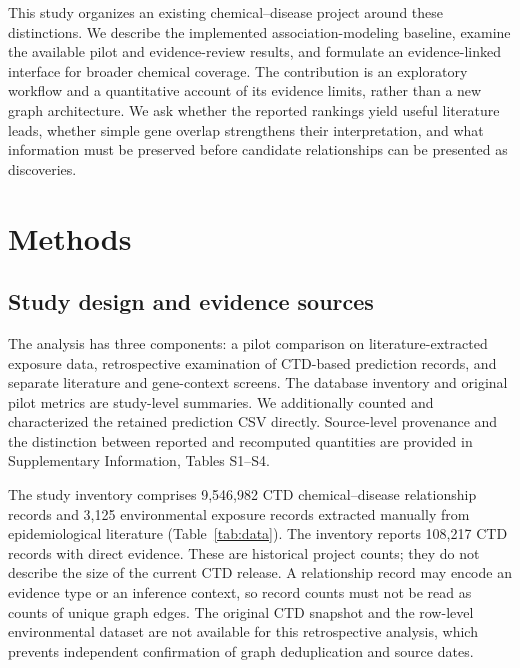 This study organizes an existing chemical--disease project around these distinctions. We describe the implemented association-modeling baseline, examine the available pilot and evidence-review results, and formulate an evidence-linked interface for broader chemical coverage. The contribution is an exploratory workflow and a quantitative account of its evidence limits, rather than a new graph architecture. We ask whether the reported rankings yield useful literature leads, whether simple gene overlap strengthens their interpretation, and what information must be preserved before candidate relationships can be presented as discoveries.

\section{Methods}
\subsection{Study design and evidence sources}
The analysis has three components: a pilot comparison on literature-extracted exposure data, retrospective examination of CTD-based prediction records, and separate literature and gene-context screens. The database inventory and original pilot metrics are study-level summaries. We additionally counted and characterized the retained prediction CSV directly. Source-level provenance and the distinction between reported and recomputed quantities are provided in Supplementary Information, Tables S1--S4.

The study inventory comprises 9,546,982 CTD chemical--disease relationship records and 3,125 environmental exposure records extracted manually from epidemiological literature (Table~\ref{tab:data}). The inventory reports 108,217 CTD records with direct evidence. These are historical project counts; they do not describe the size of the current CTD release. A relationship record may encode an evidence type or an inference context, so record counts must not be read as counts of unique graph edges. The original CTD snapshot and the row-level environmental dataset are not available for this retrospective analysis, which prevents independent confirmation of graph deduplication and source dates.

